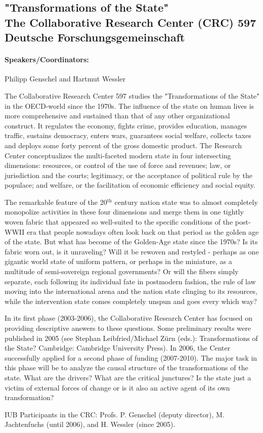 \subsection{"Transformations of the State"\\
The Collaborative Research Center (CRC) 597 \newline
Deutsche Forschungsgemeinschaft}


\paragraph{Speakers/Coordinators:} Philipp Genschel and Hartmut Wessler


\vspace{0.6cm}
The Collaborative Research Center 597 studies the "Transformations of the State" in the OECD-world since the 1970s. The influence of the state on human lives is more comprehensive and sustained than that of any other organizational construct. It regulates the economy, fights crime, provides education, manages traffic, sustains democracy, enters wars, guarantees social welfare, collects taxes and deploys some forty percent of the gross domestic product. The Research Center conceptualizes the multi-faceted modern state in four intersecting dimensions: resources, or control of the use of force and revenues; law, or jurisdiction and the courts; legitimacy, or the acceptance of political rule by the populace; and welfare, or the facilitation of economic efficiency and social equity.


\vspace{0.6cm}
The remarkable feature of the 20$^{\textrm{th}}$ century nation state was to almost completely monopolize activities in these four dimensions and merge them in one tightly woven fabric that appeared so well-suited to the specific conditions of the post-WWII era that people nowadays often look back on that period as the golden age of the state. But what has become of the Golden-Age state since the 1970s? Is its fabric worn out, is it unraveling? Will it be rewoven and restyled - perhaps as one gigantic world state of uniform pattern, or perhaps in the miniature, as a multitude of semi-sovereign regional governments? Or will the fibers simply separate, each following its individual fate in postmodern fashion, the rule of law moving into the international arena and the nation state clinging to its resources, while the intervention state comes completely unspun and goes every which way?


\vspace{0.6cm}
In its first phase (2003-2006), the Collaborative Research Center has focused on providing descriptive answers to these questions. Some preliminary results were published in 2005 (see Stephan Leibfried/Michael Z\"urn (eds.): Transformations of the State? Cambridge: Cambridge University Press). In 2006, the Center successfully applied for a second phase of funding (2007-2010). The major task in this phase will be to analyze the causal structure of the transformations of the state. What are the drivers? What are the critical junctures? Is the state just a victim of external forces of change or is it also an active agent of its own transformation? 


\vspace{0.6cm}
IUB Participants in the CRC:
Profs. P. Genschel (deputy director), M. Jachtenfuchs (until 2006), and H. Wessler (since 2005).

